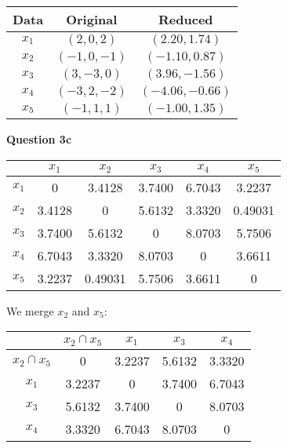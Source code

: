 \documentclass[11pt,a4paper]{report}
\begin{document}
\begin{multicols*}{2}
\begin{center}
\begin{tabular}{| c | c | c |}
\hline
Data  & Original    & Reduced\\ \hline
$x_1$ & $(2,0,2)$   & $(2.20,1.74)$   \\
$x_2$ & $(-1,0,-1)$ & $(-1.10,0.87)$  \\
$x_3$ & $(3,-3,0)$  & $(3.96,-1.56)$  \\
$x_4$ & $(-3,2,-2)$ & $(-4.06,-0.66)$ \\
$x_5$ & $(-1,1,1)$  & $(-1.00,1.35)$  \\ \hline
\end{tabular}
\end{center}

\noindent \textbf{Question 3c}

\begin{center}
\begin{tabular}{| c | c  c  c  c  c |} \hline
      & $x_1$  & $x_2$   & $x_3$  & $x_4$  & $x_5$   \\ \hline
$x_1$ & 0      & 3.4128  & 3.7400 & 6.7043 & 3.2237  \\
$x_2$ & 3.4128 & 0       & 5.6132 & 3.3320 & 0.49031 \\
$x_3$ & 3.7400 & 5.6132  & 0      & 8.0703 & 5.7506  \\
$x_4$ & 6.7043 & 3.3320  & 8.0703 & 0      & 3.6611  \\
$x_5$ & 3.2237 & 0.49031 & 5.7506 & 3.6611 & 0       \\ \hline
\end{tabular}
\end{center}

\noindent We merge $x_2$ and $x_5$:

\begin{center}
\begin{tabular}{| c | c  c  c  c  |} \hline
               & $x_2 \cap x_5$  & $x_1$   & $x_3$  & $x_4$  \\ \hline
$x_2 \cap x_5$ & 0               & 3.2237  & 5.6132 & 3.3320 \\
$x_1$          & 3.2237          & 0       & 3.7400 & 6.7043 \\
$x_3$          & 5.6132          & 3.7400  & 0      & 8.0703 \\
$x_4$          & 3.3320          & 6.7043  & 8.0703 & 0      \\ \hline
\end{tabular}
\end{center}


\end{multicols*}
\end{document}
